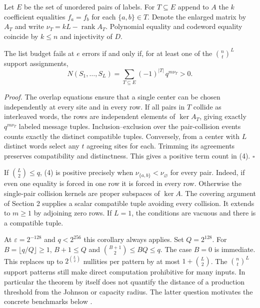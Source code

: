 \documentclass[11pt,letterpaper]{article}
\newcommand{\rank}{\operatorname{rank}}
\newcommand{\head}[1]{\vspace{.2em}{\large\bfseries\color{ink}#1}\par}
\begin{document}
Let $E$ be the set of unordered pairs of labels. For $T\subseteq E$ append to $A$ the $k$ coefficient equalities $f_a=f_b$ for each $\{a,b\}\in T$. Denote the enlarged matrix by $A_T$ and write $\nu_T=kL-\rank A_T$. Polynomial equality and codeword equality coincide by $k\le n$ and injectivity of $D$.

\head{Theorem 2.}
The list budget fails at $e$ errors if and only if, for at least one of the $\binom nt^L$ support assignments,
\[
  N(S_1,\ldots,S_L)
     =\sum_{T\subseteq E}(-1)^{|T|}\,q^{m\nu_T}>0 .
 \tag{4}
\]

\textit{Proof.} The overlap equations ensure that a single center can be chosen independently at every site and in every row. If all pairs in $T$ collide as interleaved words, the rows are independent elements of $\ker A_T$, giving exactly $q^{m\nu_T}$ labeled message tuples. Inclusion--exclusion over the pair-collision events counts exactly the distinct compatible tuples. Conversely, from a center with $L$ distinct words select any $t$ agreeing sites for each. Trimming its agreements preserves compatibility and distinctness. This gives a positive term count in (4). \hfill$\square$

\head{Corollary 3.}
If $\binom L2\le q$, (4) is positive precisely when $\nu_{\{a,b\}}<\nu_\varnothing$ for every pair. Indeed, if even one equality is forced in one row it is forced in every row. Otherwise the single-pair collision kernels are proper subspaces of $\ker A$. The covering argument of Section 2 supplies a scalar compatible tuple avoiding every collision. It extends to $m\ge1$ by adjoining zero rows. If $L=1$, the conditions are vacuous and there is a compatible tuple.

At $\varepsilon=2^{-128}$ and $q<2^{256}$ this corollary always applies. Set $Q=2^{128}$. For $B=\lfloor q/Q\rfloor\ge1$, $B+1\le Q$ and $\binom{B+1}{2}\le BQ\le q$. The case $B=0$ is immediate. This replaces up to $2^{\binom L2}$ nullities per pattern by at most $1+\binom L2$. The $\binom nt^L$ support patterns still make direct computation prohibitive for many inputs. In particular the theorem by itself does not quantify the distance of a production threshold from the Johnson or capacity radius. The latter question motivates the concrete benchmarks below \cite{abf}.
\end{document}
